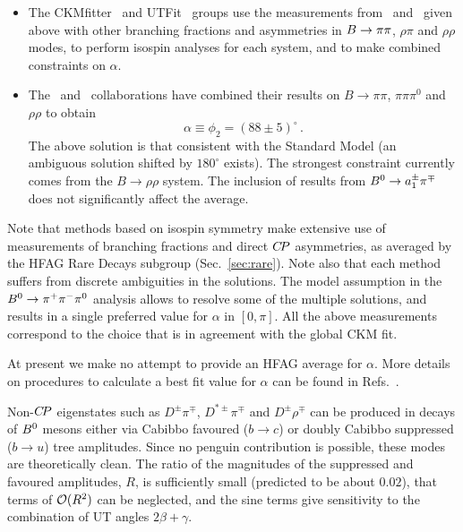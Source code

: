 \begin{itemize}
\item 
  The CKMfitter~\cite{Charles:2004jd} and 
  UTFit~\cite{Bona:2005vz} groups use the measurements 
  from \belle\ and \babar\ given above
  with other branching fractions and \CP asymmetries in 
  $B\to\pi\pi$, $\rho\pi$ and $\rho\rho$ modes, 
  to perform isospin analyses for each system, 
  and to make combined constraints on $\alpha$.

\item
  The \babar\ and \belle\ collaborations have combined their results on $B \to \pi\pi$, $\pi\pi\pi^0$ and $\rho\rho$ to obtain~\cite{Bevan:2014iga}
  \begin{equation}
    \alpha \equiv \phi_2 = (88 \pm 5)^\circ \, .
  \end{equation}
  The above solution is that consistent with the Standard Model (an ambiguous solution shifted by $180^\circ$ exists). The strongest constraint currently comes from the $B \to \rho\rho$ system. The inclusion of results from $B^0 \to a_1^\pm \pi^\mp$ does not significantly affect the average. 
\end{itemize}

Note that methods based on isospin symmetry make extensive use of 
measurements of branching fractions and direct $C\!P$ asymmetries,
as averaged by the HFAG Rare Decays subgroup (Sec.~\ref{sec:rare}).
Note also that each method suffers from discrete ambiguities in the solutions.
The model assumption in the $B^0 \to \pi^+\pi^-\pi^0$ analysis 
allows to resolve some of the multiple solutions, 
and results in a single preferred value for $\alpha$ in $\left[ 0, \pi \right]$.
All the above measurements correspond to the choice
that is in agreement with the global CKM fit.

At present we make no attempt to provide an HFAG average for $\alpha$.
More details on procedures to calculate a best fit value for $\alpha$ 
can be found in Refs.~\cite{Charles:2004jd,Bona:2005vz}.

\clearpage
{}
\label{sec:cp_uta:cud}

Non-$C\!P$ eigenstates such as $D^\pm\pi^\mp$, $D^{*\pm}\pi^\mp$ and $D^\pm\rho^\mp$ can be produced 
in decays of $B^0$ mesons either via Cabibbo favoured ($b \to c$) or
doubly Cabibbo suppressed ($b \to u$) tree amplitudes. 
Since no penguin contribution is possible,
these modes are theoretically clean.
The ratio of the magnitudes of the suppressed and favoured amplitudes, $R$,
is sufficiently small (predicted to be about $0.02$),
that terms of ${\cal O}(R^2)$ can be neglected, 
and the sine terms give sensitivity to the combination of UT angles $2\beta+\gamma$.

